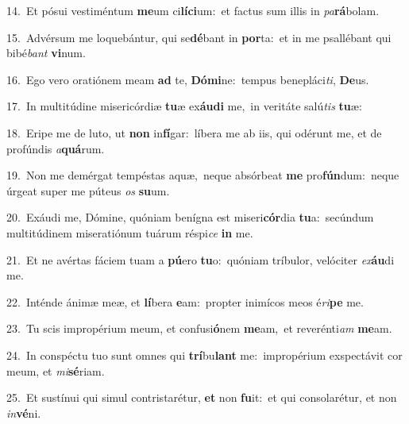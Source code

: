 {\numbfont\textcolor{\numbcolor}{14.}}~Et pósui vestiméntum \textbf{me}\-um ci\-\textbf{lí}\-\textbf{ci}um:~\star et factus sum illis in \textit{pa}\-\textbf{rá}bolam.\par
{\numbfont\textcolor{\numbcolor}{15.}}~Advérsum me loquebántur, qui se\-\textbf{dé}\-bant in \textbf{por}\-ta:~\star et in me psallébant qui bibé\textit{bant} \textbf{vi}\-num.\par
{\numbfont\textcolor{\numbcolor}{16.}}~Ego vero oratiónem meam \textbf{ad} te, \textbf{Dó}\-\textbf{mi}ne:~\star tempus benepláci\-\textit{ti}\-, \textbf{De}\-us.\par
{\numbfont\textcolor{\numbcolor}{17.}}~In multitúdine misericórdiæ \textbf{tu}\-æ ex\-\textbf{áu}\-\textbf{di} me,~\star in veritáte salú\textit{tis} \textbf{tu}\-æ:\par
{\numbfont\textcolor{\numbcolor}{18.}}~Eripe me de luto, ut \textbf{non} in\-\textbf{fí}\-gar:~\star líbera me ab iis, qui odérunt me, et de profúndis \textit{a}\-\textbf{quá}rum.\par
{\numbfont\textcolor{\numbcolor}{19.}}~Non me demérgat tempéstas aquæ,~\dagger neque absórbeat \textbf{me} pro\-\textbf{fún}\-dum:~\star neque úrgeat super me púteus \textit{os} \textbf{su}\-um.\par
{\numbfont\textcolor{\numbcolor}{20.}}~Exáudi me, Dómine, quóniam benígna est miseri\-\textbf{cór}\-dia \textbf{tu}\-a:~\star secúndum multitúdinem miseratiónum tuárum réspi\textit{ce} \textbf{in} me.\par
{\numbfont\textcolor{\numbcolor}{21.}}~Et ne avértas fáciem tuam a \textbf{pú}\-ero \textbf{tu}\-o:~\star quóniam tríbulor, velóciter \textit{ex}\-\textbf{áu}di me.\par
{\numbfont\textcolor{\numbcolor}{22.}}~Inténde ánimæ meæ, et \textbf{lí}\-bera \textbf{e}\-am:~\star propter inimícos meos é\-\textit{ri}\-\textbf{pe} me.\par
{\numbfont\textcolor{\numbcolor}{23.}}~Tu scis impropérium meum, et confusi\-\textbf{ó}\-nem \textbf{me}\-am,~\star et reverénti\textit{am} \textbf{me}\-am.\par
{\numbfont\textcolor{\numbcolor}{24.}}~In conspéctu tuo sunt omnes qui \textbf{trí}\-bu\textbf{lant} me:~\star impropérium exspectávit cor meum, et \textit{mi}\-\textbf{sé}riam.\par
{\numbfont\textcolor{\numbcolor}{25.}}~Et sustínui qui simul contristarétur, \textbf{et} non \textbf{fu}\-it:~\star et qui consolarétur, et non \textit{in}\-\textbf{vé}ni.\par

